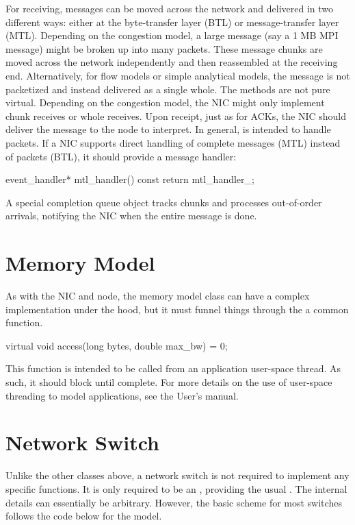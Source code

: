 For receiving, messages can be moved across the network and delivered in two different ways:
either at the byte-transfer layer (BTL) or message-transfer layer (MTL).
Depending on the congestion model, a large message (say a 1 MB MPI message) might be broken up into many packets.
These message chunks are moved across the network independently and then reassembled at the receiving end.
Alternatively, for flow models or simple analytical models, the message is not packetized and instead delivered as a single whole.
The methods are not pure virtual.  Depending on the congestion model,  the NIC might only implement chunk receives or whole receives.
Upon receipt, just as for ACKs, the NIC should deliver the message to the node to interpret.
In general,  is intended to handle packets. 
If a NIC supports direct handling of complete messages (MTL) instead of packets (BTL),
it should provide a message handler:

\begin{CppCode}
event_handler*
mtl_handler() const {
  return mtl_handler_;
}
\end{CppCode}

A special completion queue object tracks chunks and processes out-of-order arrivals,
notifying the NIC when the entire message is done.

\section{Memory Model}\label{sec:memModel}
As with the NIC and node, the memory model class can have a complex implementation under the hood,
but it must funnel things through the a common function.

\begin{CppCode}
virtual void
access(long bytes, double max_bw) = 0;
\end{CppCode}

This function is intended to be called from an application user-space thread.
As such, it should block until complete.
For more details on the use of user-space threading to model applications,
see the User's manual.


\section{Network Switch}\label{sec:networkSwitch}

Unlike the other classes above, a network switch is not required to implement any specific functions.
It is only required to be an , providing the usual .
The internal details can essentially be arbitrary.
However, the basic scheme for most switches follows the code below for the  model.

